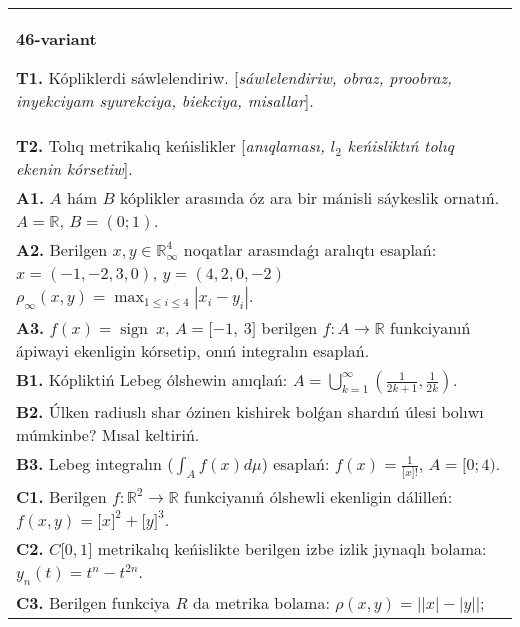 \documentclass{article}
\DeclareMathOperator{\sign}{sign}
\begin{document}
\begin{tabular}{m{17cm}}
\textbf{46-variant}
\newline

\textbf{T1.} Kópliklerdi sáwlelendiriw. [\textit{sáwlelendiriw, obraz, proobraz, inyekciyam syurekciya, biekciya, misallar}]. \\
\textbf{T2.} Tolıq metrikalıq keńislikler [\textit{anıqlaması, \(l_{2}\) keńisliktıń tolıq ekenin kórsetiw}]. \\
\textbf{A1.} \(A\) hám \(B\) kóplikler arasında óz ara bir mánisli sáykeslik ornatıń. \(A\mathbb{= R}\), \(B = (0;1)\). \\
\textbf{A2.} Berilgen \(x,y \in \mathbb{R}_{\infty}^{4}\) noqatlar arasındaǵı aralıqtı esaplań: \(x = ( - 1, - 2,3,0)\), \(y = (4,2,0, - 2)\) \(\rho_{\infty}(x,y) = \max_{1 \leq i \leq 4}\left| x_{i} - y_{i} \right|\). \\
\textbf{A3.} \(f(x) = \sign \ x\), \(A = \lbrack - 1,\ 3\rbrack\) berilgen \(f:A\rightarrow\mathbb{R}\) funkciyanıń ápiwayi ekenligin kórsetip, onıń integralın esaplań. \\
\textbf{B1.} Kópliktiń Lebeg ólshewin anıqlań: \(A = \bigcup_{k = 1}^{\infty}\left( \frac{1}{2k + 1},\frac{1}{2k} \right)\). \\
\textbf{B2.} Úlken radiuslı shar ózinen kishirek bolǵan shardıń úlesi bolıwı múmkinbe? Mısal keltiriń. \\
\textbf{B3.} Lebeg integralın (\(\int_{A}^{}{f(x)d\mu}\)) esaplań: \(f(x) = \frac{1}{\lbrack x\rbrack!}\), \(A = \lbrack 0;4)\). \\
\textbf{C1.} Berilgen \(f:\mathbb{R}^{2}\mathbb{\rightarrow R}\) funkciyanıń ólshewli ekenligin dálilleń: \(f(x,y) = \lbrack x\rbrack^{2} + \lbrack y\rbrack^{3}\). \\
\textbf{C2.} \(C\lbrack 0,1\rbrack\) metrikalıq keńislikte berilgen izbe izlik jıynaqlı bolama: \(y_{n}(t) = t^{n} - t^{2n}\). \\
\textbf{C3.} Berilgen funkciya \(R\) da metrika bolama: \(\rho(x,y) = \left| |x| - |y| \right|\); \\

\end{tabular}
\vspace{1cm}
\end{document}
